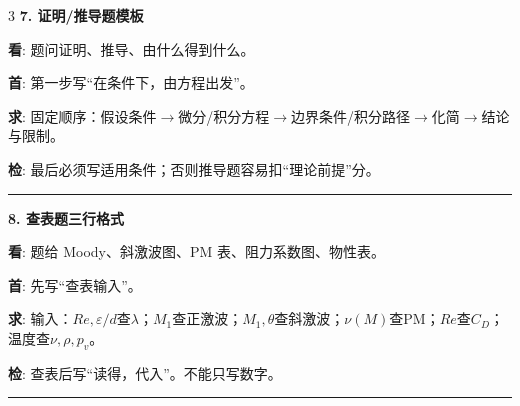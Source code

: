 \documentclass[UTF8,a4paper]{ctexart}
\newcommand{\lab}[1]{\textbf{\textcolor{B}{#1}}}
\newcommand{\blk}[5]{\textbf{\textcolor{B}{#1}}\par
\lab{看}: #2\par
\lab{首}: #3\par
\lab{求}: #4\par
\lab{检}: #5\par\vspace{1pt}\hrule\vspace{1.2pt}}
\begin{document}
\begin{multicols}{3}
\blk{7. 证明/推导题模板}
{题问证明、推导、由什么得到什么。}
{第一步写“在\underline{\hspace{0.45cm}}条件下，由\underline{\hspace{0.6cm}}方程出发”。}
{固定顺序：假设条件$\to$微分/积分方程$\to$边界条件/积分路径$\to$化简$\to$结论与限制。}
{最后必须写适用条件；否则推导题容易扣“理论前提”分。}

\blk{8. 查表题三行格式}
{题给 Moody、斜激波图、PM 表、阻力系数图、物性表。}
{先写“查表输入”。}
{输入：$Re,\varepsilon/d$查$\lambda$；$M_1$查正激波；$M_1,\theta$查斜激波；$\nu(M)$查PM；$Re$查$C_D$；温度查$\nu,\rho,p_v$。}
{查表后写“读得\underline{\hspace{0.5cm}}，代入\underline{\hspace{0.5cm}}”。不能只写数字。}

\end{multicols}\newpage
\end{document}
